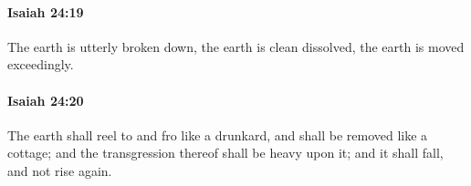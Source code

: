 		\paragraph{Isaiah 24:19} %
			\label{ISAIAH-24-19}

			The earth is utterly broken down, the earth is clean dissolved, the earth is moved exceedingly.


		\paragraph{Isaiah 24:20} %
			\label{ISAIAH-24-20}

			The earth shall reel to and fro like a drunkard, and shall be removed like a cottage; and the transgression thereof shall be heavy upon it; and it shall fall, and not rise again.



